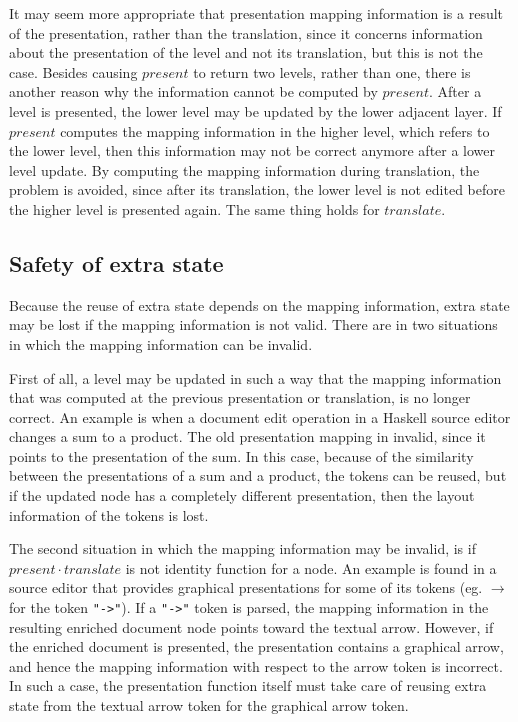 It may seem more appropriate that presentation mapping information is a result of the presentation, rather than the translation, since it concerns information about the presentation of the level and not its translation, but this is not the case. Besides causing $present$ to return two levels, rather than one, there is another reason why the information cannot be computed by $present$. After a level is presented, the lower level may be updated by the lower adjacent layer. If $present$ computes the mapping information in the higher level, which refers to the lower level, then this information may not be correct anymore after a lower level update. By computing the mapping information during translation, the problem is avoided, since after its translation, the lower level is not edited before the higher level is presented again. The same thing holds for $translate$.



%																
\subsection{Safety of extra state}

Because the reuse of extra state depends on the mapping information, extra state may be lost if the mapping information is not valid. There are in two situations in which the mapping information can be invalid.  

First of all, a level may be updated in such a way that the mapping information that was computed at the previous presentation or translation, is no longer correct. An example is when a document edit operation in a Haskell source editor changes a sum to a product. The old presentation mapping in invalid, since it points to the presentation of the sum. In this case, because of the similarity between the presentations of a sum and a product, the tokens can be reused, but if the updated node has a completely different presentation, then the layout information of the tokens is lost.

The second situation in which the mapping information may be invalid, is if $present \cdot translate$ is not identity function for a node.  An example is found in a source editor that provides graphical presentations for some of its tokens (eg. $\rightarrow$ for the token \verb|"->"|). If a \verb|"->"| token is parsed, the mapping information in the resulting enriched document node points toward the textual arrow. However, if the enriched document is presented, the presentation contains a graphical arrow, and hence the mapping information with respect to the arrow token is incorrect. In such a case, the presentation function itself must take care of reusing extra state from the textual arrow token for the graphical arrow token.

